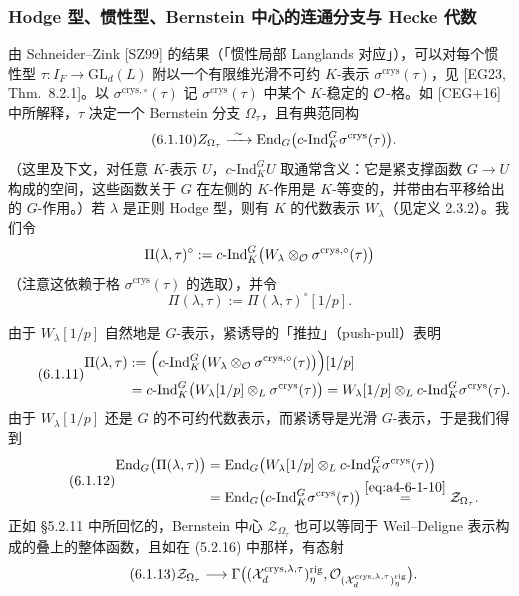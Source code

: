 \subsubsection{Hodge 型、惯性型、Bernstein 中心的连通分支与 Hecke 代数}
由 Schneider--Zink [SZ99] 的结果（「惯性局部 Langlands 对应」），可以对每个惯性型 $\tau:I_F\to\mathrm{GL}_d(L)$ 附以一个有限维光滑不可约 $K$-表示 $\sigma^{\mathrm{crys}}(\tau)$，见 [EG23, Thm.\ 8.2.1]。以 $\sigma^{\mathrm{crys},\circ}(\tau)$ 记 $\sigma^{\mathrm{crys}}(\tau)$ 中某个 $K$-稳定的 $\mathcal{O}$-格。如 [CEG+16] 中所解释，$\tau$ 决定一个 Bernstein 分支 $\Omega_\tau$，且有典范同构
\begin{equation}\tag{6.1.10}\label{eq:a4-6-1-10}
Z_{\Omega_\tau}\xrightarrow{\ \sim\ }\operatorname{End}_G\bigl(c\text{-}\mathrm{Ind}_K^G\sigma^{\mathrm{crys}}(\tau)\bigr).
\end{equation}
（这里及下文，对任意 $K$-表示 $U$，$c\text{-}\mathrm{Ind}_K^G U$ 取通常含义：它是紧支撑函数 $G\to U$ 构成的空间，这些函数关于 $G$ 在左侧的 $K$-作用是 $K$-等变的，并带由右平移给出的 $G$-作用。）若 $\lambda$ 是正则 Hodge 型，则有 $K$ 的代数表示 $W_\lambda$（见定义 2.3.2）。我们令
\[
\Pi(\lambda,\tau)^\circ:=c\text{-}\mathrm{Ind}_K^G\bigl(W_\lambda\otimes_{\mathcal{O}}\sigma^{\mathrm{crys},\circ}(\tau)\bigr)
\]
（注意这依赖于格 $\sigma^{\mathrm{crys}}(\tau)$ 的选取），并令
\[
\Pi(\lambda,\tau):=\Pi(\lambda,\tau)^\circ[1/p].
\]

由于 $W_\lambda[1/p]$ 自然地是 $G$-表示，紧诱导的「推拉」（push-pull）表明
\begin{equation}\tag{6.1.11}\label{eq:a4-6-1-11}
\begin{aligned}
\Pi(\lambda,\tau)&:=\Bigl(c\text{-}\mathrm{Ind}_K^G\bigl(W_\lambda\otimes_{\mathcal{O}}\sigma^{\mathrm{crys},\circ}(\tau)\bigr)\Bigr)[1/p]\\
&=c\text{-}\mathrm{Ind}_K^G\bigl(W_\lambda[1/p]\otimes_L\sigma^{\mathrm{crys}}(\tau)\bigr)
=W_\lambda[1/p]\otimes_L c\text{-}\mathrm{Ind}_K^G\sigma^{\mathrm{crys}}(\tau).
\end{aligned}
\end{equation}
由于 $W_\lambda[1/p]$ 还是 $G$ 的不可约代数表示，而紧诱导是光滑 $G$-表示，于是我们得到
\begin{equation}\tag{6.1.12}\label{eq:a4-6-1-12}
\begin{aligned}
\operatorname{End}_G\bigl(\Pi(\lambda,\tau)\bigr)&=\operatorname{End}_G\bigl(W_\lambda[1/p]\otimes_L c\text{-}\mathrm{Ind}_K^G\sigma^{\mathrm{crys}}(\tau)\bigr)\\
&=\operatorname{End}_G\bigl(c\text{-}\mathrm{Ind}_K^G\sigma^{\mathrm{crys}}(\tau)\bigr)\overset{\eqref{eq:a4-6-1-10}}{=}\mathcal{Z}_{\Omega_\tau}.
\end{aligned}
\end{equation}
正如 §5.2.11 中所回忆的，Bernstein 中心 $\mathcal{Z}_{\Omega_\tau}$ 也可以等同于 Weil--Deligne 表示构成的叠上的整体函数，且如在 (5.2.16) 中那样，有态射
\begin{equation}\tag{6.1.13}\label{eq:a4-6-1-13}
\mathcal{Z}_{\Omega_\tau}\longrightarrow\Gamma\bigl((\mathcal{X}_d^{\mathrm{crys},\lambda,\tau})^{\mathrm{rig}}_\eta,\mathcal{O}_{(\mathcal{X}_d^{\mathrm{crys},\lambda,\tau})^{\mathrm{rig}}_\eta}\bigr).
\end{equation}

